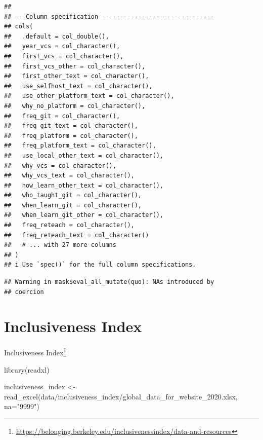 \documentclass[
]{krantz}
\makeatletter
\newenvironment{Shaded}{\begin{snugshade}}{\end{snugshade}}
\newcommand{\AttributeTok}[1]{\textcolor[rgb]{0.61,0.61,0.61}{#1}}
\newcommand{\FunctionTok}[1]{\textcolor[rgb]{0,0,0}{#1}}
\newcommand{\NormalTok}[1]{#1}
\newcommand{\OtherTok}[1]{\textcolor[rgb]{0.37,0.37,0.37}{#1}}
\newcommand{\StringTok}[1]{\textcolor[rgb]{0.5,0.5,0.5}{#1}}
\renewcommand{\href}[2]{#2\footnote{\url{#1}}}
\newenvironment{kframe}{%
\medskip{}
\setlength{\fboxsep}{.8em}
 \def\at@end@of@kframe{}%
 \ifinner\ifhmode%
  \def\at@end@of@kframe{\end{minipage}}%
  \begin{minipage}{\columnwidth}%
 \fi\fi%
 \def\FrameCommand##1{\hskip\@totalleftmargin \hskip-\fboxsep
 \colorbox{shadecolor}{##1}\hskip-\fboxsep
     \hskip-\linewidth \hskip-\@totalleftmargin \hskip\columnwidth}%
 \MakeFramed {\advance\hsize-\width
   \@totalleftmargin\z@ \linewidth\hsize
   \@setminipage}}%
 {\par\unskip\endMakeFramed%
 \at@end@of@kframe}
\renewenvironment{Shaded}{\begin{kframe}}{\end{kframe}}
\makeatother
\begin{document}
\begin{verbatim}
## 
## -- Column specification -------------------------------
## cols(
##   .default = col_double(),
##   year_vcs = col_character(),
##   first_vcs = col_character(),
##   first_vcs_other = col_character(),
##   first_other_text = col_character(),
##   use_selfhost_text = col_character(),
##   use_other_platform_text = col_character(),
##   why_no_platform = col_character(),
##   freq_git = col_character(),
##   freq_git_text = col_character(),
##   freq_platform = col_character(),
##   freq_platform_text = col_character(),
##   use_local_other_text = col_character(),
##   why_vcs = col_character(),
##   why_vcs_text = col_character(),
##   how_learn_other_text = col_character(),
##   who_taught_git = col_character(),
##   when_learn_git = col_character(),
##   when_learn_git_other = col_character(),
##   freq_reteach = col_character(),
##   freq_reteach_text = col_character()
##   # ... with 27 more columns
## )
## i Use `spec()` for the full column specifications.
\end{verbatim}

\begin{verbatim}
## Warning in mask$eval_all_mutate(quo): NAs introduced by
## coercion
\end{verbatim}

\hypertarget{inclusiveness-index}{%
\section*{Inclusiveness Index}\label{inclusiveness-index}}


\href{https://belonging.berkeley.edu/inclusivenessindex/data-and-resources}{Inclusiveness Index}

\begin{Shaded}
\begin{Highlighting}[]
\FunctionTok{library}\NormalTok{(readxl)}
\end{Highlighting}
\end{Shaded}

\begin{Shaded}
\begin{Highlighting}[]
\NormalTok{inclusiveness\_index }\OtherTok{\textless{}{-}} \FunctionTok{read\_excel}\NormalTok{(}\StringTok{\textquotesingle{}data/inclusiveness\_index/global\_data\_for\_website\_2020.xlsx\textquotesingle{}}\NormalTok{, }\AttributeTok{na=}\StringTok{"9999"}\NormalTok{)}
\end{Highlighting}
\end{Shaded}
\end{document}
